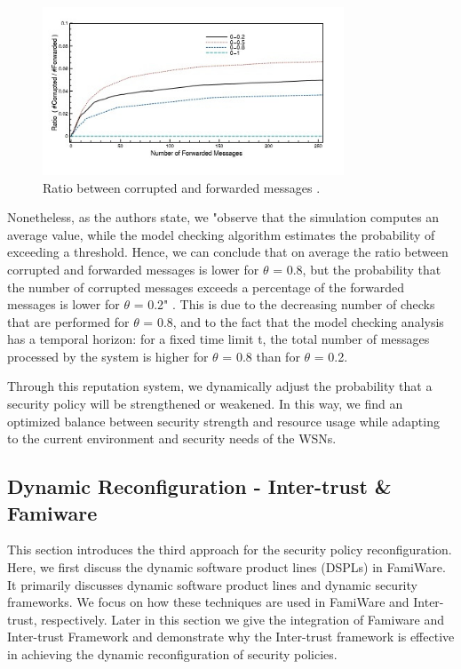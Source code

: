 \documentclass[12pt,a4paper,twoside]{report}
\begin{document}
\begin{figure}[ht]
	\begin{center}
  \includegraphics[width=0.8\textwidth,natwidth=429,natheight=239]{./figures/figure-05.jpg}
  \end{center}
  \caption{Ratio between corrupted and forwarded messages \cite{vigo;etal:2014}.}
  \label{fig:05}
\end{figure}
Nonetheless, as the authors state, we "observe that the simulation computes an average value, while the model checking algorithm estimates the probability of exceeding a threshold. Hence, we can conclude that on average the ratio between corrupted and forwarded messages is lower for $\theta$ = 0.8, but the probability that the number of corrupted messages exceeds a percentage of the forwarded messages is lower for $\theta$ = 0.2" \cite{vigo;etal:2014}. This is due to the decreasing number of checks that are performed for $\theta$ = 0.8, and to the fact that the model checking analysis has a temporal horizon: for a fixed time limit t, the total number of messages processed by the system is higher for $\theta$ = 0.8 than for $\theta$ = 0.2.\par
Through this reputation system, we dynamically adjust the probability that a security policy will be strengthened or weakened. In this way, we find an optimized balance between security strength and resource usage while adapting to the current environment and security needs of the WSNs. \par

\subsection{Dynamic Reconfiguration - Inter-trust \& Famiware}
This section introduces the third approach for the security policy reconfiguration. Here, we first discuss the dynamic software product lines (DSPLs) in FamiWare. It primarily discusses dynamic software product lines and dynamic security frameworks. We focus on how these techniques are used in FamiWare and Inter-trust, respectively. Later in this section we give the integration of Famiware and Inter-trust Framework and demonstrate why the Inter-trust framework is effective in achieving the dynamic reconfiguration of security policies. 
\end{document}
